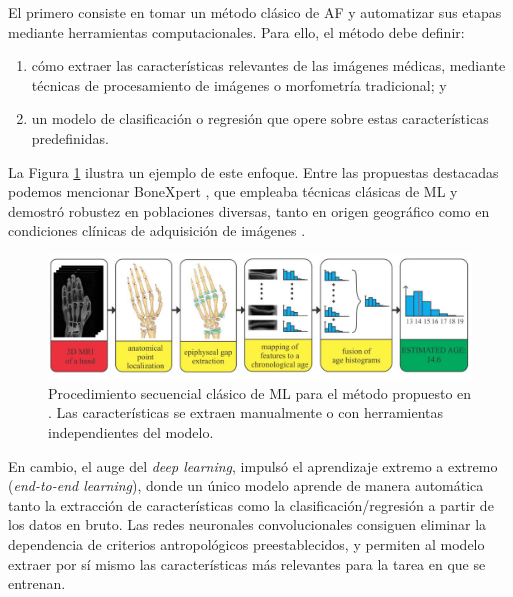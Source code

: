 El primero consiste en tomar un método clásico de \acrshort{AF} y automatizar sus etapas mediante herramientas computacionales. Para ello, el método debe definir:

\begin{enumerate}
    
    \item cómo extraer las características relevantes de las imágenes médicas, mediante técnicas de procesamiento de imágenes o morfometría tradicional; y

    \item un modelo de clasificación o regresión que opere sobre estas características predefinidas.

\end{enumerate}

La Figura \ref{fig:MRI_pipeline} ilustra un ejemplo de este enfoque. Entre las propuestas destacadas podemos mencionar BoneXpert \cite{thodberg2008}, que empleaba técnicas clásicas de \acrshort{ML} y demostró robustez en poblaciones diversas, tanto en origen geográfico como en condiciones clínicas de adquisición de imágenes \cite{van2009, martin2010, thodberg2010}. 

\begin{figure}[htbp]
    \centering
    \includegraphics[width=\textwidth]{capitulos/cap_01/imagenes/MRI_pipeline.png}
    \caption[
        Procedimiento secuencial clásico de \acrshort{ML} para el método propuesto en \cite{stern2014}.
    ]{
        Procedimiento secuencial clásico de \acrshort{ML} para el método propuesto en \cite{stern2014}. 
        Las características se extraen manualmente o con herramientas independientes del modelo.
    }
    \label{fig:MRI_pipeline}
\end{figure}

En cambio, el auge del \textit{deep learning}, impulsó el aprendizaje extremo a extremo (\textit{end-to-end learning}), donde un único modelo aprende de manera automática tanto la extracción de características como la clasificación/regresión a partir de los datos en bruto. Las redes neuronales convolucionales consiguen eliminar la dependencia de criterios antropológicos preestablecidos, y permiten al modelo extraer por sí mismo las características más relevantes para la tarea en que se entrenan. 

